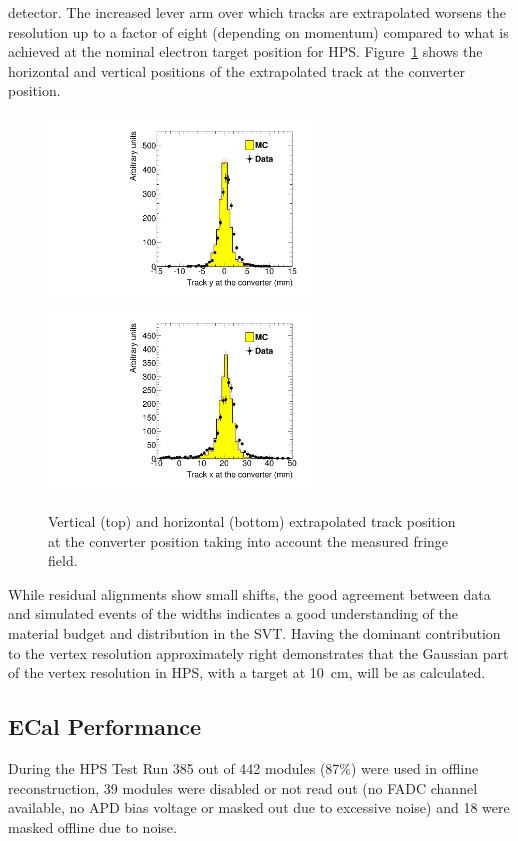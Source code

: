 \documentclass[final,3p,times,twocolumn]{elsarticle}
\begin{document}
detector. The increased 
lever arm over which tracks are extrapolated worsens the resolution up to a factor of eight 
(depending on momentum) compared to what is achieved at the nominal electron target position for 
HPS. Figure~\ref{fig:impact_param} shows the horizontal and vertical positions of the extrapolated track 
at the converter position. 
\begin{figure}[]
\begin{center}
	\includegraphics[width=7cm]{h_trk_top_fr_conv_z_h_trk_top_conv_z_dataMC_twotrksel-mod}
	\includegraphics[width=7cm]{h_trk_top_fr_conv_y_h_trk_top_conv_y_dataMC_twotrksel-mod}
	\caption{\small Vertical (top) and horizontal (bottom) extrapolated track position at the converter position 
	taking into account the measured fringe field. 	
	\label{fig:impact_param}}
\end{center}
\end{figure}
While residual alignments show small shifts, the good agreement  between data and simulated 
events of the widths indicates a good understanding of the material budget and distribution in the SVT.  
Having the dominant contribution to the vertex resolution approximately right demonstrates that the 
Gaussian part of the vertex resolution in HPS, with a target at 10~cm, will be as calculated.



\subsection{ECal Performance}
\label{sec:ecal_calibration}
During the HPS Test Run 385 out of 442 modules (87\%) were used in offline reconstruction, 39 modules 
were disabled or not read out (no FADC channel available, no APD bias voltage or masked out due to 
excessive noise) and 18 were masked offline due to noise. 
\end{document}
